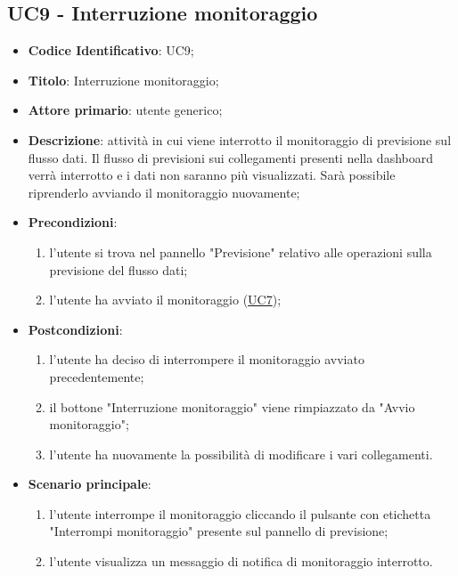 	\subsection{UC9 - Interruzione monitoraggio}
		\begin{itemize}
			\item\textbf{Codice Identificativo}: UC9;
			\item\textbf{Titolo}: Interruzione monitoraggio;
			\item\textbf{Attore primario}: utente generico;
			\item\textbf{Descrizione}: attività in cui viene interrotto il monitoraggio di previsione sul flusso dati. Il flusso di previsioni sui collegamenti presenti nella dashboard verrà interrotto e i dati non saranno più visualizzati. Sarà possibile riprenderlo avviando il monitoraggio nuovamente;
			\item\textbf{Precondizioni}: 
			\begin{enumerate}
				\item l'utente si trova nel pannello "Previsione" relativo alle operazioni sulla previsione del flusso dati;
				\item l'utente ha avviato il monitoraggio (\hyperref[par:UC7]{UC7});
			\end{enumerate}		
			\item\textbf{Postcondizioni}:
				\begin{enumerate}	
					\item l'utente ha deciso di interrompere il monitoraggio avviato precedentemente;
					\item il bottone "Interruzione monitoraggio" viene rimpiazzato da "Avvio monitoraggio";
					\item l'utente ha nuovamente la possibilità di modificare i vari collegamenti.
				\end{enumerate}	
			\item\textbf{Scenario principale}: 
			\begin{enumerate}
			\item l'utente interrompe il monitoraggio cliccando il pulsante con etichetta "Interrompi monitoraggio" presente sul pannello di previsione;
			\item l'utente visualizza un messaggio di notifica di monitoraggio interrotto.
\end{enumerate}			 		
		\end{itemize}
		
	\label{par:UC9.1}
